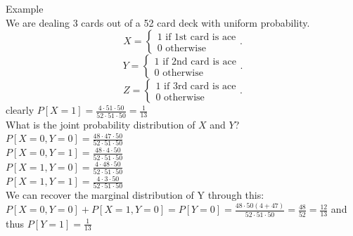 \documentclass[a4paper]{article}
\begin{document}
\begin{remark}{Example}\\
  We are dealing 3 cards out of a 52 card deck with uniform probability.
  \[
  X=\begin{cases}
    1 \text{ if 1st card is ace} \\ 
    0 \text{ otherwise}
  \end{cases}
  .\] 
  \[
  Y=\begin{cases}
    1 \text{ if 2nd card is ace} \\
    0 \text{ otherwise}
  \end{cases}
  .\] 
  \[
  Z=\begin{cases}
    1 \text{ if 3rd card is ace} \\
    0 \text{ otherwise} 
  \end{cases}
  .\]
  clearly $P[X = 1] = \frac{4 \cdot 51 \cdot 50}{52 \cdot 51 \cdot 50} = \frac{1}{13}$ \\
  
  What is the joint probability distribution of $X$ and $Y$?\\
  $P[X=0, Y= 0] = \frac{48 \cdot 47 \cdot 50}{52 \cdot 51 \cdot 50}$ \\
  $P[X=0, Y =1] = \frac{48 \cdot 4 \cdot 50}{52 \cdot 51 \cdot 50}$ \\
  $P[X=1, Y=0] = \frac{4 \cdot 48 \cdot 50}{52 \cdot 51 \cdot 50}$ \\
  $P[X=1, Y=1] = \frac{4 \cdot 3 \cdot 50}{52 \cdot 51 \cdot 50}$ \\
 
  We can recover the marginal distribution of Y through this: \\
  $P[X=0, Y=0] + P[X=1, Y=0] = P[Y=0] = \frac{48\cdot 50 (4 + 47)}{52 \cdot 51 \cdot 50} = \frac{48}{52} = \frac{12}{13}$ and thus $P[Y=1] = \frac{1}{13}$
  
\end{remark}
\end{document}
